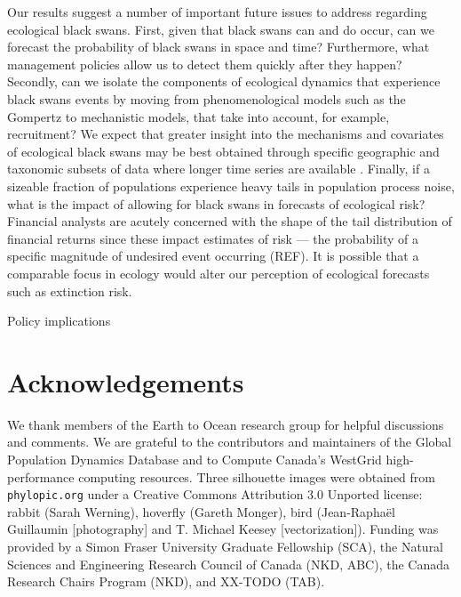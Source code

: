 Our results suggest a number of important future issues to address regarding ecological black swans. First, given that black swans can and do occur, can we forecast the probability of black swans in space and time? Furthermore, what management policies allow us to detect them quickly after they happen? Secondly, can we isolate the components of ecological dynamics that experience black swans events by moving from phenomenological models such as the Gompertz to mechanistic models, that take into account, for example, recruitment? We expect that greater insight into the mechanisms and covariates of ecological black swans may be best obtained through specific geographic and taxonomic subsets of data where longer time series are available \citep[e.g.][]{segura2013}. Finally, if a sizeable fraction of populations experience heavy tails in population process noise, what is the impact of allowing for black swans in forecasts of ecological risk? Financial analysts are acutely concerned with the shape of the tail distribution of financial returns since these impact estimates of risk --- the probability of a specific magnitude of undesired event occurring (REF). It is possible that a comparable focus in ecology would alter our perception of ecological forecasts such as extinction risk.

Policy implications

\section{Acknowledgements}

We thank members of the Earth to Ocean research group for helpful discussions and comments. We are grateful to the contributors and maintainers of the Global Population Dynamics Database and to Compute Canada's WestGrid high-performance computing resources. Three silhouette images were obtained from \texttt{phylopic.org} under a Creative Commons Attribution 3.0 Unported license: rabbit (Sarah Werning), hoverfly (Gareth Monger), bird (Jean-Raphaël Guillaumin {[}photography{]} and T. Michael Keesey {[}vectorization{]}). Funding was provided by a Simon Fraser University Graduate Fellowship (SCA), the Natural Sciences and Engineering Research Council of Canada (NKD, ABC), the Canada Research Chairs Program (NKD), and XX-TODO (TAB).




\clearpage

